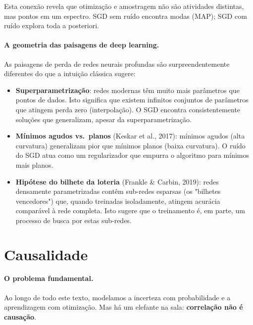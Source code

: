 \documentclass{tufte-handout}
\begin{document}
Esta conexão revela que otimização e amostragem não são atividades distintas, mas
pontos em um espectro. SGD sem ruído encontra modas (MAP); SGD com ruído explora
toda a posteriori.

\paragraph{A geometria das paisagens de deep learning.}

As paisagens de perda de redes neurais profundas são surpreendentemente diferentes
do que a intuição clássica sugere:

\begin{itemize}
    \item \textbf{Superparametrização}: redes modernas têm muito mais parâmetros que
    pontos de dados. Isto significa que existem infinitos conjuntos de parâmetros que
    atingem perda zero (interpolação). O SGD encontra consistentemente soluções que
    generalizam, apesar da superparametrização.
    \item \textbf{Mínimos agudos vs.\ planos} (Keskar et al., 2017): mínimos agudos
    (alta curvatura) generalizam pior que mínimos planos (baixa curvatura). O ruído
    do SGD atua como um regularizador que empurra o algoritmo para mínimos mais
    planos.
    \item \textbf{Hipótese do bilhete da loteria} (Frankle \& Carbin, 2019): redes
    densamente parametrizadas contêm sub-redes esparsas (os "bilhetes vencedores")
    que, quando treinadas isoladamente, atingem acurácia comparável à rede completa.
    Isto sugere que o treinamento é, em parte, um processo de busca por estas sub-redes.
\end{itemize}

\section{Causalidade}

\paragraph{O problema fundamental.}

Ao longo de todo este texto, modelamos a incerteza com probabilidade e a
aprendizagem com otimização. Mas há um elefante na sala: \textbf{correlação não é
causação}.
\end{document}
